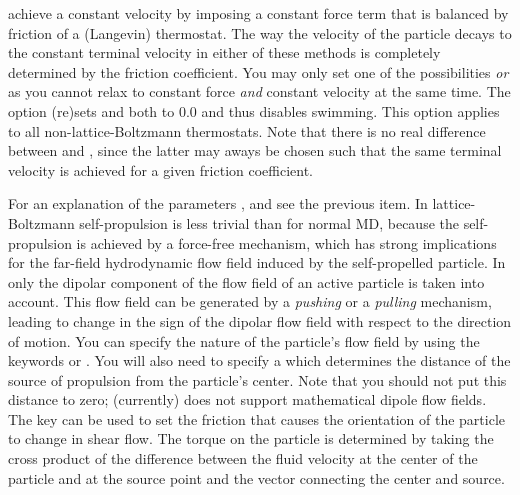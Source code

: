 \begin{arguments}
  achieve a constant velocity by imposing a constant force term
   that is balanced by friction of a (Langevin)
  thermostat. The way the velocity of the particle decays to the
  constant terminal velocity in either of these methods is completely
  determined by the friction coefficient. You may only set one of the
  possibilities  \emph{or}  as you
  cannot relax to constant force \emph{and} constant velocity at the
  same time. The option  (re)sets  and
   both to $0.0$ and thus disables swimming. This option
  applies to all non-lattice-Boltzmann thermostats. Note that there is
  no real difference between  and ,
  since the latter may aways be chosen such that the same terminal
  velocity is achieved for a given friction coefficient.
\item[{\parbox[t]{\linewidth}{\optlong{swimming \alt{%
          \alt{v_swim \var{v\_swim} \asep f_swim \var{f\_swim}}
          \alt{pusher \asep puller} dipole_length \var{dipole\_length}
          rotational_friction \var{rotational\_friction} \asep off}%
      }}}] For an explanation of the parameters ,
   and  see the previous item. In
  lattice-Boltzmann self-propulsion is less trivial than for normal
  MD, because the self-propulsion is achieved by a force-free
  mechanism, which has strong implications for the far-field
  hydrodynamic flow field induced by the self-propelled particle. In
  \es{} only the dipolar component of the flow field of an active
  particle is taken into account. This flow field can be generated by
  a \emph{pushing} or a \emph{pulling} mechanism, leading to change in
  the sign of the dipolar flow field with respect to the direction of
  motion. You can specify the nature of the particle's flow field by
  using the keywords  or . You will
  also need to specify a  which determines the
  distance of the source of propulsion from the particle's
  center. Note that you should not put this distance to zero; \es{}
  (currently) does not support mathematical dipole flow fields. The
  key  can be used to set the friction
  that causes the orientation of the particle to change in shear
  flow. The torque on the particle is determined by taking the cross
  product of the difference between the fluid velocity at the center
  of the particle and at the source point and the vector connecting
  the center and source.


\end{arguments}
